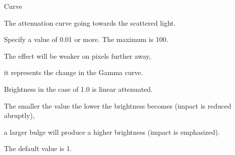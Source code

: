 \documentclass[a4paper,12pt]{article}
\begin{document}
Curve\par
The attenuation curve going towards the scattered light.\par
Specify a value of 0.01 or more. The maximum is 100.\par
The effect will be weaker on pixels further away,\par
it represents the change in the Gamma curve.\par
Brightness in the case of 1.0 is linear attenuated.\par
The smaller the value the lower the brightness becomes (impact is reduced abruptly),\par
a larger bulge will produce a higher brightness (impact is emphasized).\par
The default value is 1.

\newpage

\thispagestyle{empty}
\end{document}

